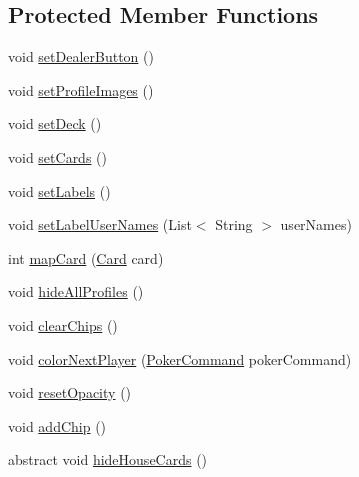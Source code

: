 \subsection*{Protected Member Functions}
\begin{DoxyCompactItemize}
\item 
void \hyperlink{classhu_1_1elte_1_1bfw1p6_1_1poker_1_1client_1_1view_1_1_abstract_main_view_ab94f4b126248ca12da05f5eba72291a9}{set\+Dealer\+Button} ()
\item 
void \hyperlink{classhu_1_1elte_1_1bfw1p6_1_1poker_1_1client_1_1view_1_1_abstract_main_view_af98c5244f416e8c7a0c97fab21f7d9e8}{set\+Profile\+Images} ()
\item 
void \hyperlink{classhu_1_1elte_1_1bfw1p6_1_1poker_1_1client_1_1view_1_1_abstract_main_view_a4db009e6b8c6b0ad9ddcdd356968f465}{set\+Deck} ()
\item 
void \hyperlink{classhu_1_1elte_1_1bfw1p6_1_1poker_1_1client_1_1view_1_1_abstract_main_view_a14c1d2ef6a33467d75dc3577f79e8d30}{set\+Cards} ()
\item 
void \hyperlink{classhu_1_1elte_1_1bfw1p6_1_1poker_1_1client_1_1view_1_1_abstract_main_view_ac17267ada7ede496331ca42e369534ac}{set\+Labels} ()
\item 
void \hyperlink{classhu_1_1elte_1_1bfw1p6_1_1poker_1_1client_1_1view_1_1_abstract_main_view_a70de12f8dc937b8ade7fa2acf5a31d3b}{set\+Label\+User\+Names} (List$<$ String $>$ user\+Names)
\item 
int \hyperlink{classhu_1_1elte_1_1bfw1p6_1_1poker_1_1client_1_1view_1_1_abstract_main_view_a0069b74c562fcce8dc2200d6f4dd780b}{map\+Card} (\hyperlink{classcom_1_1cantero_1_1games_1_1poker_1_1texasholdem_1_1_card}{Card} card)
\item 
void \hyperlink{classhu_1_1elte_1_1bfw1p6_1_1poker_1_1client_1_1view_1_1_abstract_main_view_a750f92ebc9a87ab0b2e56c3023742dfe}{hide\+All\+Profiles} ()
\item 
void \hyperlink{classhu_1_1elte_1_1bfw1p6_1_1poker_1_1client_1_1view_1_1_abstract_main_view_ac887189177e4e753c9b24c024728bd73}{clear\+Chips} ()
\item 
void \hyperlink{classhu_1_1elte_1_1bfw1p6_1_1poker_1_1client_1_1view_1_1_abstract_main_view_ad5ac5a97ddfd756d771f0e42c3906497}{color\+Next\+Player} (\hyperlink{interfacehu_1_1elte_1_1bfw1p6_1_1poker_1_1command_1_1_poker_command}{Poker\+Command} poker\+Command)
\item 
void \hyperlink{classhu_1_1elte_1_1bfw1p6_1_1poker_1_1client_1_1view_1_1_abstract_main_view_a62dc8c8109e209b33df63e4594bf1437}{reset\+Opacity} ()
\item 
void \hyperlink{classhu_1_1elte_1_1bfw1p6_1_1poker_1_1client_1_1view_1_1_abstract_main_view_a4a8684bb0856046e62469d00c459d9c3}{add\+Chip} ()
\item 
abstract void \hyperlink{classhu_1_1elte_1_1bfw1p6_1_1poker_1_1client_1_1view_1_1_abstract_main_view_a8b859629f3589a0e0b80cfb5a3f695e1}{hide\+House\+Cards} ()
\end{DoxyCompactItemize}
